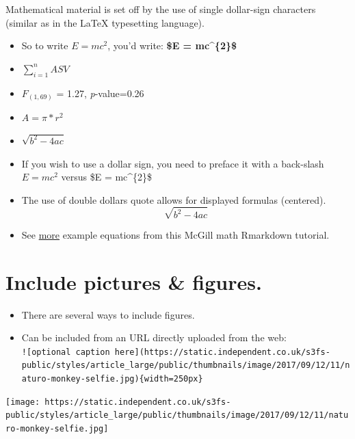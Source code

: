 \documentclass[]{article}
\begin{document}
Mathematical material is set off by the use of single dollar-sign
characters (similar as in the LaTeX typesetting language).

\begin{itemize}
\item
  So to write \(E = mc^{2}\), you'd write: \textbf{\$E = mc\^{}\{2\}\$}
\item
  \(\sum_{i=1}^n ASV\)
\item
  \(F_{(1,69)}\) = 1.27, \emph{p}-value=0.26
\item
  \(A = \pi*r^{2}\)
\item
  \(\sqrt{b^2 - 4ac}\)
\item
  If you wish to use a dollar sign, you need to preface it with a
  back-slash \(E = mc^{2}\) versus \$E = mc\^{}\{2\}\$
\item
  The use of double dollars quote allows for displayed formulas
  (centered). \[\sqrt{b^2 - 4ac}\]
\item
  See
  \href{http://www.math.mcgill.ca/yyang/regression/RMarkdown/example.html}{more}
  example equations from this McGill math Rmarkdown tutorial.
\end{itemize}

\hypertarget{include-pictures-figures.}{%
\section{Include pictures \& figures.}\label{include-pictures-figures.}}

\begin{itemize}
\item
  There are several ways to include figures.
\item
  Can be included from an URL directly uploaded from the web:\\
  \texttt{!{[}optional\ caption\ here{]}(https://static.independent.co.uk/s3fs-public/styles/article\_large/public/thumbnails/image/2017/09/12/11/naturo-monkey-selfie.jpg)\{width=250px\}}
\end{itemize}

\texttt{[image: https://static.independent.co.uk/s3fs-public/styles/article\_large/public/thumbnails/image/2017/09/12/11/naturo-monkey-selfie.jpg]}\\
\hspace*{0.333em}\\
\hspace*{0.333em}\\
\hspace*{0.333em}
\end{document}
